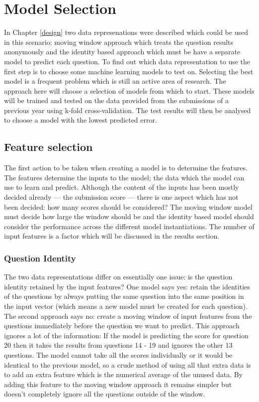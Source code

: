 \chapter{Model Selection}
\label{machinelearning}
In Chapter \ref{design} two data represenations were described which could be used in this scenario: moving window approach which treats the question results anonymously and the identity based approach which must be have a separate model to predict each question. To find out which data representation to use the first step is to choose some machine learning models to test on. Selecting the best model is a frequent problem which is still an active area of research. The approach here will choose a selection of models from which to start. These models will be trained and tested on the data provided from the submissions of a previous year using k-fold cross-validation. The test results will then be analysed to choose a model with the lowest predicted error. 

\section{Feature selection}
The first action to be taken when creating a model is to determine the features. The features determine the inputs to the model; the data which the model can use to learn and predict. Although the content of the inputs has been mostly decided already --- the submission score --- there is one aspect which has not been decided: how many scores should be considered? The moving window model must decide how large the window should be and the identity based model should consider the performance across the different model instantiations. The number of input features is a factor which will be discussed in the results section.

\subsection{Question Identity}
The two data representations differ on essentially one issue: is the question identity retained by the input features? One model says yes: retain the identities of the questions by always putting the same question into the same position in the input vector (which means a new model must be created for each question). The second approach says no: create a moving window of input features from the questions immediately before the question we want to predict. This approach ignores a lot of the information: If the model is predicting the score for question 20 then it takes the results from questions 14 - 19 and ignores the other 13 questions. The model cannot take all the scores individually or it would be identical to the previous model, so a crude method of using all that extra data is to add an extra feature which is the numerical average of the unused data. By adding this feature to the moving window approach it remains simpler but doesn't completely ignore all the questions outside of the window.

